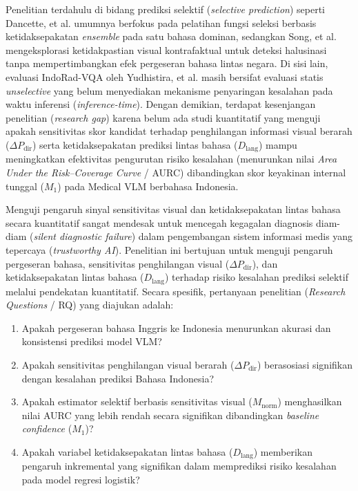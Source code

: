 \documentclass[a4paper,10pt,twoside]{article}
\begin{document}
Penelitian terdahulu di bidang prediksi selektif (\textit{selective prediction}) seperti Dancette, et al. \cite{dancette2023improving} umumnya berfokus pada pelatihan fungsi seleksi berbasis ketidaksepakatan \textit{ensemble} pada satu bahasa dominan, sedangkan Song, et al. \cite{song2026detecting} mengeksplorasi ketidakpastian visual kontrafaktual untuk deteksi halusinasi tanpa mempertimbangkan efek pergeseran bahasa lintas negara. Di sisi lain, evaluasi IndoRad-VQA oleh Yudhistira, et al. \cite{yudhistira2026does} masih bersifat evaluasi statis \textit{unselective} yang belum menyediakan mekanisme penyaringan kesalahan pada waktu inferensi (\textit{inference-time}). Dengan demikian, terdapat kesenjangan penelitian (\textit{research gap}) karena belum ada studi kuantitatif yang menguji apakah sensitivitas skor kandidat terhadap penghilangan informasi visual berarah ($\Delta P_{\mathrm{dir}}$) serta ketidaksepakatan prediksi lintas bahasa ($D_{\mathrm{lang}}$) mampu meningkatkan efektivitas pengurutan risiko kesalahan (menurunkan nilai \textit{Area Under the Risk--Coverage Curve} / AURC) dibandingkan skor keyakinan internal tunggal ($M_1$) pada Medical VLM berbahasa Indonesia.

Menguji pengaruh sinyal sensitivitas visual dan ketidaksepakatan lintas bahasa secara kuantitatif sangat mendesak untuk mencegah kegagalan diagnosis diam-diam (\textit{silent diagnostic failure}) dalam pengembangan sistem informasi medis yang tepercaya (\textit{trustworthy AI}). Penelitian ini bertujuan untuk menguji pengaruh pergeseran bahasa, sensitivitas penghilangan visual ($\Delta P_{\mathrm{dir}}$), dan ketidaksepakatan lintas bahasa ($D_{\mathrm{lang}}$) terhadap risiko kesalahan prediksi selektif melalui pendekatan kuantitatif. Secara spesifik, pertanyaan penelitian (\textit{Research Questions} / RQ) yang diajukan adalah:
\begin{enumerate}[label=(RQ\arabic*),leftmargin=*]
    \item Apakah pergeseran bahasa Inggris ke Indonesia menurunkan akurasi dan konsistensi prediksi model VLM?
    \item Apakah sensitivitas penghilangan visual berarah ($\Delta P_{\mathrm{dir}}$) berasosiasi signifikan dengan kesalahan prediksi Bahasa Indonesia?
    \item Apakah estimator selektif berbasis sensitivitas visual ($M_{\mathrm{norm}}$) menghasilkan nilai AURC yang lebih rendah secara signifikan dibandingkan \textit{baseline confidence} ($M_1$)?
    \item Apakah variabel ketidaksepakatan lintas bahasa ($D_{\mathrm{lang}}$) memberikan pengaruh inkremental yang signifikan dalam memprediksi risiko kesalahan pada model regresi logistik?
\end{enumerate}
\end{document}
